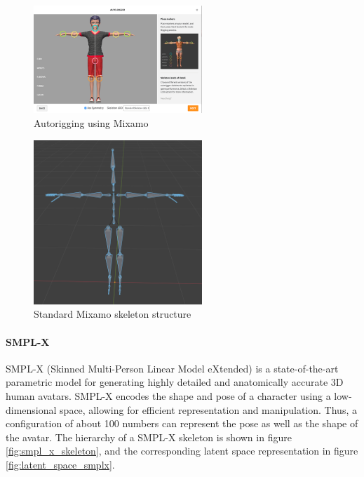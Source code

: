 \documentclass[../../main.tex]{subfiles}
\begin{document}
\begin{figure} 
  \centering \includegraphics[width = 2.5in]{chapters/background_work/images/mixamo_autorigging.png} 
  \caption{Autorigging using Mixamo} 
  \label{fig:mixamo_autorigging} 
\end{figure}

\begin{figure} 
  \centering \includegraphics[width = 2.5in]{chapters/background_work/images/mixamo_skeleton.png} 
  \caption{Standard Mixamo skeleton structure} 
  \label{fig:mixamo_skeleton} 
\end{figure}

\paragraph{SMPL-X}
\label{par:smpl_x}

SMPL-X (Skinned Multi-Person Linear Model eXtended) is a state-of-the-art parametric model for generating highly detailed and anatomically accurate 3D human avatars. SMPL-X encodes the shape and pose of a character using a low-dimensional space, allowing for efficient representation and manipulation. Thus, a configuration of about 100 numbers can represent the pose as well as the shape of the avatar. The hierarchy of a SMPL-X skeleton is shown in figure \ref{fig:smpl_x_skeleton}, and the corresponding latent space representation in figure \ref{fig:latent_space_smplx}.
\end{document}
